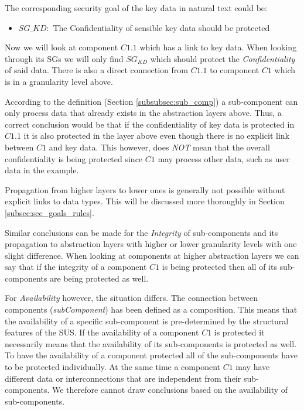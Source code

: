 The corresponding security goal of the key data in natural text could be:

\begin{itemize}
\item[]\textbf{$SG\_{KD}:$} The Confidentiality of sensible key data should be protected
\end{itemize}

Now we will look at component $C1.1$ which has a link to key data. When looking through its SGs we will only find $SG_{KD}$ which should protect the \textit{Confidentiality} of said data. There is also a direct connection from $C1.1$ to component $C1$ which is in a granularity level above. 

According to the definition (Section \ref{subsubsec:sub_comp}) a sub-component can only process data that already exists in the abstraction layers above. Thus, a correct conclusion would be that if the confidentiality of key data is protected in $C1.1$ it is also protected in the layer above even though there is no explicit link between $C1$ and key data. This however, does \textit{NOT} mean that the overall confidentiality is being protected since $C1$ may process other data, such 
as user data in the example.

Propagation from higher layers to lower ones is generally not possible without explicit links to data types. This will be discussed more thoroughly in Section \ref{subsec:sec_goals_rules}.

Similar conclusions can be made for the \textit{Integrity} of sub-components and its propagation to abstraction layers with higher or lower granularity levels with one slight difference. When looking at components at higher abstraction layers we can say that if the integrity of a component $C1$ is being protected then all of its sub-components are being protected as well. 

For \textit{Availability} however, the situation differs. The connection between components (\textit{subComponent}) has been defined as a composition. This means that the availability of a specific sub-component is pre-determined by the structural features of the SUS. If the availability of a component $C1$ is protected it necessarily means that the availability of its sub-components is protected as well. To have the availability of a component protected all of the sub-components have to be protected individually. At the same time a component $C1$ may have different data or interconnections that are independent from their sub-components. We therefore cannot draw conclusions based on the availability of sub-components. 

